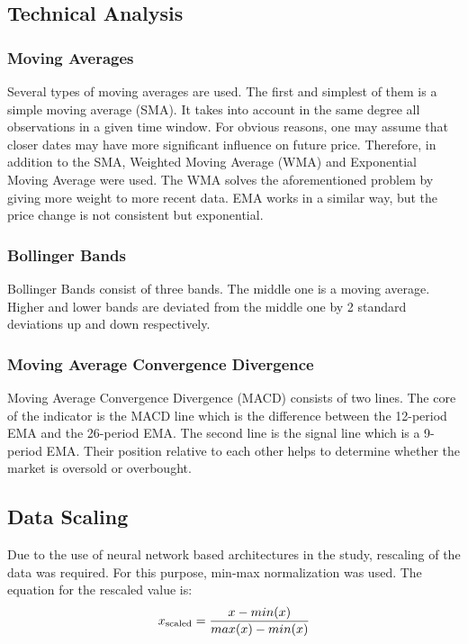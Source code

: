 \documentclass[11pt]{article} %
\begin{document}
\subsection{Technical Analysis}
\subsubsection{Moving Averages}
Several types of moving averages are used. The first and simplest of them is a simple moving average (SMA). It takes into account in the same degree all observations in a given time window. For obvious reasons, one may assume that closer dates may have more significant influence on future price. Therefore, in addition to the SMA, Weighted Moving Average (WMA) and Exponential Moving Average were used. The WMA solves the aforementioned problem by giving more weight to more recent data. EMA works in a similar way, but the price change is not consistent but exponential.

\subsubsection{Bollinger Bands}
Bollinger Bands consist of three bands. The middle one is a moving average. Higher and lower bands are deviated from the middle one by 2 standard deviations up and down respectively. 

\subsubsection{Moving Average Convergence Divergence}
Moving Average Convergence Divergence (MACD) consists of two lines. The core of the indicator is the MACD line which is the difference between the 12-period EMA and the 26-period EMA. The second line is the signal line which is a 9-period EMA. Their position relative to each other helps to determine whether the market is oversold or overbought.


\subsection{Data Scaling}
Due to the use of neural network based architectures in the study, rescaling of the data was required. For this purpose, min-max normalization was used. The equation for the rescaled value is: 
\begin{equation} x\textsubscript{scaled} = \frac{x - min(x)}{max(x) - min(x)} \end{equation}
\end{document}
